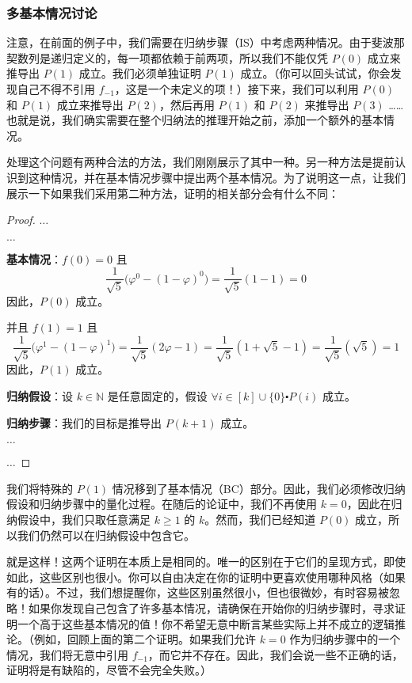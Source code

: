 \subsubsection*{多基本情况讨论}

注意，在前面的例子中，我们需要在归纳步骤（IS）中考虑两种情况。由于斐波那契数列是递归定义的，每一项都依赖于前两项，所以我们不能仅凭 $P(0)$ 成立来推导出 $P(1)$ 成立。我们必须单独证明 $P(1)$ 成立。（你可以回头试试，你会发现自己不得不引用 $f_{-1}$，这是一个未定义的项！）接下来，我们可以利用 $P(0)$ 和 $P(1)$ 成立来推导出 $P(2)$，然后再用 $P(1)$ 和 $P(2)$ 来推导出 $P(3)$ ……也就是说，我们确实需要在整个归纳法的推理开始之前，添加一个额外的基本情况。

处理这个问题有两种合法的方法，我们刚刚展示了其中一种。另一种方法是提前认识到这种情况，并在基本情况步骤中提出两个基本情况。为了说明这一点，让我们展示一下如果我们采用第二种方法，证明的相关部分会有什么不同：

\begin{proof}

    $\dots$

    $\dots$

    \textbf{基本情况}：$f(0) = 0$ 且
    \[\frac{1}{\sqrt{5}}\big(\varphi^0-(1-\varphi)^0\big) = \frac{1}{\sqrt{5}} (1-1) = 0\]
    因此，$P(0)$ 成立。

    并且 $f(1) = 1$ 且
    \[\frac{1}{\sqrt{5}}\big(\varphi^1-(1-\varphi)^1\big) = \frac{1}{\sqrt{5}} (2\varphi-1) = \frac{1}{\sqrt{5}} (1+\sqrt{5}-1) = \frac{1}{\sqrt{5}} (\sqrt{5}) = 1\]
    因此，$P(1)$ 成立。

    \textbf{归纳假设}：设 $k \in \mathbb{N}$ 是任意固定的，假设 $\forall i \in [k] \cup \{0\} \centerdot P(i)$ 成立。

    \textbf{归纳步骤}：我们的目标是推导出 $P(k+1)$ 成立。

    $\dots$

    $\dots$
\end{proof}

我们将特殊的 $P(1)$ 情况移到了基本情况（BC）部分。因此，我们必须修改归纳假设和归纳步骤中的量化过程。在随后的论证中，我们不再使用 $k = 0$，因此在归纳假设中，我们只取任意满足 $k \ge 1$ 的 $k$。然而，我们已经知道 $P(0)$ 成立，所以我们仍然可以在归纳假设中包含它。

就是这样！这两个证明在本质上是相同的。唯一的区别在于它们的呈现方式，即使如此，这些区别也很小。你可以自由决定在你的证明中更喜欢使用哪种风格（如果有的话）。不过，我们想提醒你，这些区别虽然很小，但也很微妙，有时容易被忽略！如果你发现自己包含了许多基本情况，请确保在开始你的归纳步骤时，寻求证明一个高于这些基本情况的值！你不希望无意中断言某些实际上并不成立的逻辑推论。（例如，回顾上面的第二个证明。如果我们允许 $k = 0$ 作为归纳步骤中的一个情况，我们将无意中引用 $f_{-1}$，而它并不存在。因此，我们会说一些不正确的话，证明将是有缺陷的，尽管不会完全失败。）

